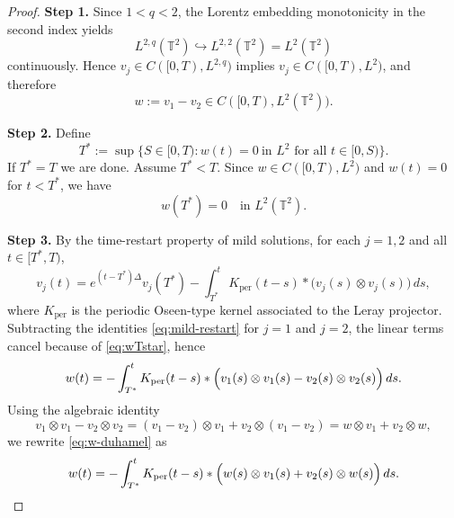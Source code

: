 \documentclass[10pt,a4paper]{amsart}
\begin{document}
\begin{proof}
\textbf{Step 1.}
Since $1<q<2$, the Lorentz embedding monotonicity in the second index yields
\[
L^{2,q}(\mathbb T^2)\hookrightarrow L^{2,2}(\mathbb T^2)=L^2(\mathbb T^2)
\]
continuously. Hence $v_j\in C([0,T),L^{2,q})$ implies $v_j\in C([0,T),L^2)$, and therefore
\[
w:=v_1-v_2\in C([0,T),L^2(\mathbb T^2)).
\]

\textbf{Step 2.}
Define
\[
T^*:=\sup\{S\in[0,T): w(t)=0\ \text{in }L^2 \text{ for all }t\in[0,S)\}.
\]
If $T^*=T$ we are done. Assume $T^*<T$. Since $w\in C([0,T),L^2)$ and $w(t)=0$ for $t<T^*$, we have
\begin{equation}\label{eq:wTstar}
w(T^*)=0\quad\text{in }L^2(\mathbb T^2).
\end{equation}

\textbf{Step 3.}
By the time-restart property of mild solutions, for each $j=1,2$ and all $t\in[T^*,T)$,
\begin{equation}\label{eq:mild-restart}
v_j(t)=e^{(t-T^*)\Delta}v_j(T^*)
-\int_{T^*}^{t} K_{\mathrm{per}}(t-s)*\bigl(v_j(s)\otimes v_j(s)\bigr)\,ds,
\end{equation}
where $K_{\mathrm{per}}$ is the periodic Oseen-type kernel associated to the Leray projector. Subtracting the identities \eqref{eq:mild-restart} for $j=1$ and $j=2$,
the linear terms cancel because of \eqref{eq:wTstar}, hence
\begin{equation}\label{eq:w-duhamel}
w(t)=-\int_{T^*}^{t} K_{\mathrm{per}}(t-s)*
\Bigl(v_1(s)\otimes v_1(s)-v_2(s)\otimes v_2(s)\Bigr)\,ds.
\end{equation}
Using the algebraic identity
\[
v_1\otimes v_1-v_2\otimes v_2=(v_1-v_2)\otimes v_1+v_2\otimes(v_1-v_2)=w\otimes v_1+v_2\otimes w,
\]
we rewrite \eqref{eq:w-duhamel} as
\begin{equation}\label{eq:w-duhamel2}
w(t)=-\int_{T^*}^{t} K_{\mathrm{per}}(t-s)*
\Bigl(w(s)\otimes v_1(s)+v_2(s)\otimes w(s)\Bigr)\,ds.
\end{equation}


\end{proof}
\end{document}

